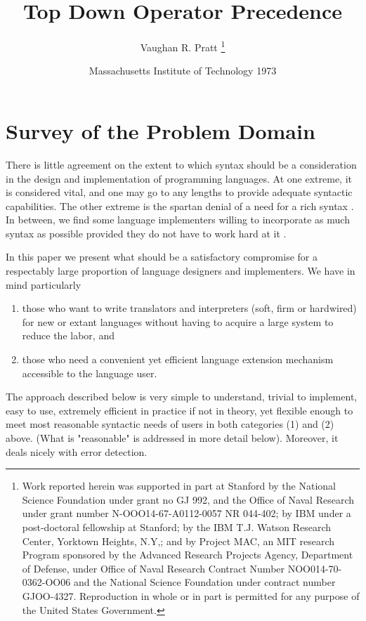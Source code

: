 \documentclass{article}
\title{Top Down Operator Precedence}
\author{Vaughan R. Pratt \thanks{Work reported herein was supported in part at
    Stanford by the National Science Foundation under grant no GJ 992, and the
    Office of Naval Research under grant number N-OOO14-67-A0112-0057 NR
    044-402; by IBM under a post-doctoral fellowship at Stanford; by the IBM
    T.J.  Watson Research Center, Yorktown Heights, N.Y,; and by Project MAC, an
    MIT research Program sponsored by the Advanced Research Projects Agency,
    Department of Defense, under Office of Naval Research Contract Number
    NOO014-70-0362-OO06 and the National Science Foundation under contract
    number GJOO-4327. Reproduction in whole or in part is permitted for any
    purpose of the United States Government.}}
\date{Massachusetts Institute of Technology 1973}
\begin{document}
\maketitle
\section{Survey of the Problem Domain}

There is little agreement on the extent to which syntax should be a
consideration in the design and implementation of programming languages. At one
extreme, it is considered vital, and one may go to any lengths
\cite{10.5555/1098667, mckeeman1970} to provide adequate syntactic
capabilities. The other extreme is the spartan denial of a need for a rich
syntax \cite{10.1145/321574.321575}. In between, we find some language
implementers willing to incorporate as much syntax as possible provided they do
not have to work hard at it \cite{10.1007/BF00264291}.

\par

In this paper we present what should be a satisfactory compromise for a
respectably large proportion of language designers and implementers. We have in
mind particularly

\begin{enumerate}
  \item those who want to write translators and interpreters (soft, firm or
    hardwired) for new or extant languages without having to acquire a large
    system to reduce the labor, and
  \item those who need a convenient yet efficient language extension mechanism
    accessible to the language user.
\end{enumerate}

\par

The approach described below is very simple to understand, trivial to implement,
easy to use, extremely efficient in practice if not in theory, yet flexible
enough to meet most reasonable syntactic needs of users in both categories (1)
and (2) above. (What is "reasonable" is addressed in more detail
below). Moreover, it deals nicely with error detection.

\par


\end{document}
